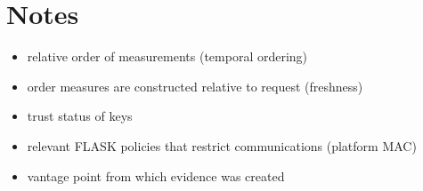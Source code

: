 \documentclass[10pt]{article}
\newcommand{\squash}{\parskip=0pt\itemsep=0pt}
\begin{document}
\nocite{Coker::Principles-of-R,Loscocco:98:The-Inevitabili}

\section*{Notes}

\begin{itemize}
  \squash
\item relative order of measurements (temporal ordering)
\item order measures are constructed relative to request (freshness)
\item trust status of keys
\item relevant FLASK policies that restrict communications (platform MAC)
\item vantage point from which evidence was created
\end{itemize}


\end{document}
